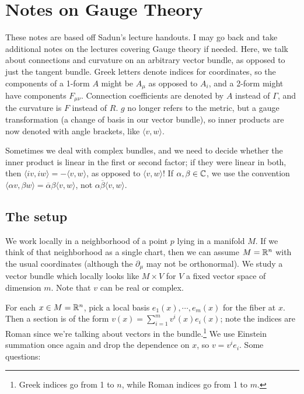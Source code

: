 \section{Notes on Gauge Theory} 
These notes are based off Sadun's lecture handouts. I may go back and take additional notes on the lectures covering Gauge theory if needed.
\orbreak
Here, we talk about connections and curvature on an arbitrary vector bundle, as opposed to just the tangent bundle. Greek letters denote indices for coordinates, so the components of a 1-form $A$ might be $A_{\mu}$ as opposed to $A_i $, and a 2-form might have components $F_{\mu\nu}$. Connection coefficients are denoted by $A$ instead of $\Gamma $, and the curvature is $F$ instead of $R$. $g$ no longer refers to the metric, but a gauge transformation (a change of basis in our vector bundle), so inner products are now denoted with angle brackets, like $\langle v,w \rangle $.

Sometimes we deal with complex bundles, and we need to decide whether the inner product is linear in the first or second factor; if they were linear in both, then $\langle iv,iw \rangle=-\langle v,w \rangle  $, as opposed to $\langle v,w \rangle $! If $\alpha ,\beta \in \mathbb{C}$, we use the convention $\langle \alpha v, \beta  w \rangle =\overline{\alpha }\beta \langle v,w \rangle $, not $\alpha  \overline{\beta }\langle v,w \rangle $.

\subsection{The setup}
We work locally in a neighborhood of a point $p$ lying in a manifold $M$. If we think of that neighborhood as a single chart, then we can assume $M=\mathbb{R}^n $ with the usual coordinates (although the $\partial _{\mu}$ may not be orthonormal). We study a vector bundle which locally looks like $M \times V$ for $V$ a fixed vector space of dimension $m$. Note that $v$ can be real or complex.  

For each $x \in M= \mathbb{R}^n $, pick a local basis $e_1(x),\cdots ,e_m(x)$ for the fiber at $x$. Then a section is of the form $v(x)=\sum _{i=1}^m v^i (x)e_i (x)$; note the indices are Roman since we're talking about vectors in the bundle.\footnote{Greek indices go from 1 to $n$, while Roman indices go from 1 to $m$.} We use Einstein summation once again and drop the dependence on $x$, so $v=v^i e_i $.
Some questions:


